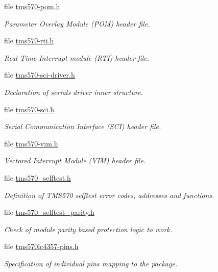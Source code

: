 \begin{DoxyCompactItemize}
file \mbox{\hyperlink{tms570-pom_8h}{tms570-\/pom.\+h}}
\begin{DoxyCompactList}\small\item\em Parameter Overlay Module (P\+OM) header file. \end{DoxyCompactList}\item 
file \mbox{\hyperlink{tms570-rti_8h}{tms570-\/rti.\+h}}
\begin{DoxyCompactList}\small\item\em Real Time Interrupt module (R\+TI) header file. \end{DoxyCompactList}\item 
file \mbox{\hyperlink{tms570-sci-driver_8h}{tms570-\/sci-\/driver.\+h}}
\begin{DoxyCompactList}\small\item\em Declaration of serial\textquotesingle{}s driver inner structure. \end{DoxyCompactList}\item 
file \mbox{\hyperlink{tms570-sci_8h}{tms570-\/sci.\+h}}
\begin{DoxyCompactList}\small\item\em Serial Communication Interface (S\+CI) header file. \end{DoxyCompactList}\item 
file \mbox{\hyperlink{tms570-vim_8h}{tms570-\/vim.\+h}}
\begin{DoxyCompactList}\small\item\em Vectored Interrupt Module (V\+IM) header file. \end{DoxyCompactList}\item 
file \mbox{\hyperlink{tms570__selftest_8h}{tms570\+\_\+selftest.\+h}}
\begin{DoxyCompactList}\small\item\em Definition of T\+M\+S570 selftest error codes, addresses and functions. \end{DoxyCompactList}\item 
file \mbox{\hyperlink{tms570__selftest__parity_8h}{tms570\+\_\+selftest\+\_\+parity.\+h}}
\begin{DoxyCompactList}\small\item\em Check of module parity based protection logic to work. \end{DoxyCompactList}\item 
file \mbox{\hyperlink{tms570lc4357-pins_8h}{tms570lc4357-\/pins.\+h}}
\begin{DoxyCompactList}\small\item\em Specification of individual pins mapping to the package. \end{DoxyCompactList}\item 

\end{DoxyCompactItemize}

